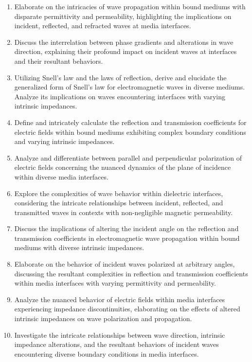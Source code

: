 \begin{enumerate}
    \item Elaborate on the intricacies of wave propagation within bound mediums with disparate permittivity and permeability, highlighting the implications on incident, reflected, and refracted waves at media interfaces.
    
    \item Discuss the interrelation between phase gradients and alterations in wave direction, explaining their profound impact on incident waves at interfaces and their resultant behaviors.
    
    \item Utilizing Snell's law and the laws of reflection, derive and elucidate the generalized form of Snell's law for electromagnetic waves in diverse mediums. Analyze its implications on waves encountering interfaces with varying intrinsic impedances.
    
    \item Define and intricately calculate the reflection and transmission coefficients for electric fields within bound mediums exhibiting complex boundary conditions and varying intrinsic impedances.
    
    \item Analyze and differentiate between parallel and perpendicular polarization of electric fields concerning the nuanced dynamics of the plane of incidence within diverse media interfaces.
    
    \item Explore the complexities of wave behavior within dielectric interfaces, considering the intricate relationships between incident, reflected, and transmitted waves in contexts with non-negligible magnetic permeability.
    
    \item Discuss the implications of altering the incident angle on the reflection and transmission coefficients in electromagnetic wave propagation within bound mediums with diverse intrinsic impedances.
    
    \item Elaborate on the behavior of incident waves polarized at arbitrary angles, discussing the resultant complexities in reflection and transmission coefficients within media interfaces with varying permittivity and permeability.
    
    \item Analyze the nuanced behavior of electric fields within media interfaces experiencing impedance discontinuities, elaborating on the effects of altered intrinsic impedances on wave polarization and propagation.
    
    \item Investigate the intricate relationships between wave direction, intrinsic impedance alterations, and the resultant behaviors of incident waves encountering diverse boundary conditions in media interfaces.
\end{enumerate}

